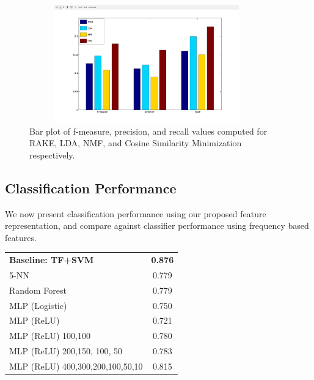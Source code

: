 \documentclass[12pt]{article}
\begin{document}
\begin{figure}[H]
\centering
\includegraphics[height=2in, width=4in]{Images/keywordresults.png}
\caption{Bar plot of f-measure, precision, and recall values computed for RAKE, LDA, NMF, and Cosine Similarity Minimization respectively.}
\end{figure}


\subsection{Classification Performance}

We now present classification performance using our proposed feature representation, and compare against classifier performance using
frequency based features.
\begin{tabular}[pos]{l c}
  \textbf{Baseline: TF+SVM} & \textbf{0.876}\\
  5-NN & 0.779\\
  Random Forest & 0.779\\
  MLP (Logistic) & 0.750\\
  MLP (ReLU) & 0.721\\
  MLP (ReLU) 100,100 & 0.780\\
  MLP (ReLU) 200,150, 100, 50 & 0.783\\
  MLP (ReLU) 400,300,200,100,50,10 & 0.815\\
\end{tabular}
\end{document}
